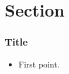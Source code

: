 \documentclass[presentation,aspectratio=169,10pt]{beamer}
\begin{document}
\section{Section}

\begin{frame}
  \frametitle{Title}

\begin{itemize}
  \item First point.
\end{itemize}

\end{frame}
\end{document}
